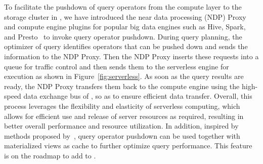 To facilitate the pushdown of query operators from the compute layer to the storage cluster in \sys, we have introduced the near data processing (NDP) Proxy and compute engine plugins for popular big data engines such as Hive, Spark, and Presto~\cite{hive, spark,presto} to invoke query operator  pushdown. 
 During query planning, the optimizer of  query  identifies operators that can be pushed down and sends the information to the NDP Proxy.  Then the NDP Proxy inserts these requests into a queue for traffic control and then sends them to the serverless engine for execution as shown in Figure~\ref{fig:serverless}.
As soon as the query results are ready, the NDP Proxy transfers them back to the compute engine using the high-speed data exchange bus of \sys, so as to ensure efficient data transfer.
Overall,  this process leverages the flexibility and elasticity of serverless computing, which allows for efficient use and release of server resources as required, resulting in better overall performance and resource utilization. In addition, inspired by  methods proposed by~\cite{yuxiangyao, napa}, query operator pushdown can be used together with materialized views as cache to further optimize query performance.  This feature is on the roadmap to add to  \sys. 
























